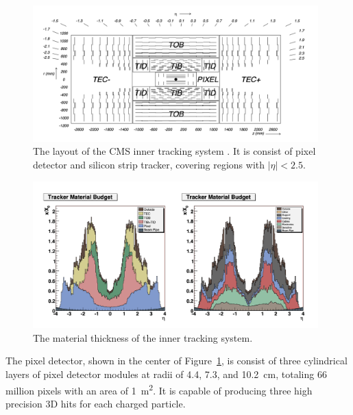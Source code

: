 \begin{figure}[ht]
    \centering
    \includegraphics[width=0.98\textwidth]{chapters/CMSExperiment/sectionDetector/figures/tracker.png}
    \caption{The layout of the CMS inner tracking system \cite{exhep:cms:Chatrchyan:2008aa}. It is consist of pixel detector and silicon strip tracker, covering regions with $|\eta|<2.5$. }
    \label{fig:cmsexperiment:detector:tracker}
\end{figure}


\begin{figure}[ht]
    \centering
    \includegraphics[width=0.98\textwidth]{chapters/CMSExperiment/sectionDetector/figures/trackerMaterial.png}
    \caption{The material thickness of the inner tracking system.}
    \label{fig:cmsexperiment:detector:trackerMaterial}
\end{figure}




The pixel detector, shown in the center of Figure~\ref{fig:cmsexperiment:detector:tracker}, is consist of three cylindrical layers of pixel detector modules at radii of 4.4, 7.3, and 10.2~cm, totaling 66 million pixels with an area of 1~\si{\m \squared}. It is capable of producing three high precision 3D hits for each charged particle. 

